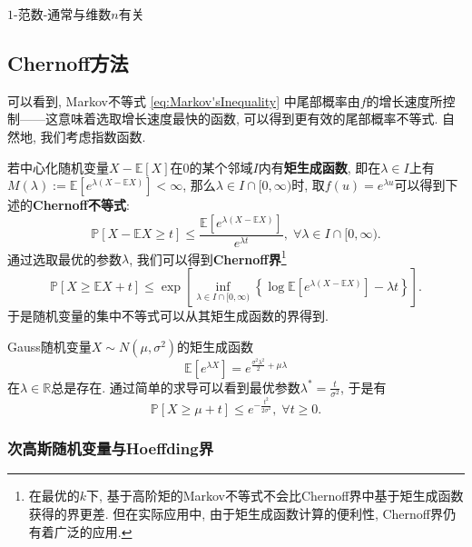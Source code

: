 $1$-范数-通常与维数$n$有关




\subsection{Chernoff方法}

可以看到, Markov不等式 \eqref{eq:Markov'sInequality} 中尾部概率由$f$的增长速度所控制——这意味着选取增长速度最快的函数, 可以得到更有效的尾部概率不等式. 
自然地, 我们考虑指数函数. 

若中心化随机变量$X - \mathbb{E}[X]$在$0$的某个邻域$I$内有\textbf{矩生成函数}, 即在$\lambda \in I$上有$M(\lambda) := \mathbb{E}[e^{\lambda (X - \mathbb{E}X)}] < \infty$, 那么$\lambda \in I \cap [0, \infty)$时, 取$f(u) = e^{\lambda u}$可以得到下述的\textbf{Chernoff不等式}: 
\begin{equation*}
	\mathbb{P}[X - \mathbb{E}X \geq t] 
	\leq \frac{\mathbb{E}[e^{\lambda(X - \mathbb{E}X)}]}{e^{\lambda t}},\;
	\forall \lambda \in I \cap [0, \infty).
\end{equation*}
通过选取最优的参数$\lambda$, 我们可以得到\textbf{Chernoff界}\footnote{在最优的$k$下, 基于高阶矩的Markov不等式不会比Chernoff界中基于矩生成函数获得的界更差. 但在实际应用中, 由于矩生成函数计算的便利性, Chernoff界仍有着广泛的应用.}
\begin{equation*}
	\mathbb{P}[X \geq \mathbb{E}X + t]
	\leq \exp \left[ \inf_{\lambda \in I \cap [0, \infty)} \left\{ \log \mathbb{E}[e^{\lambda(X - \mathbb{E}X)}] - \lambda t \right\} \right]. 
\end{equation*}
于是随机变量的集中不等式可以从其矩生成函数的界得到. 

\begin{example}[Gauss随机变量的上偏差不等式]
	Gauss随机变量$X \sim N(\mu, \sigma^2)$的矩生成函数
	\begin{equation}
		\mathbb{E}[e^{\lambda X}] = e^{\frac{\sigma^2 \lambda^2}{2} + \mu \lambda} 		
	\end{equation}
	在$\lambda \in \mathbb{R}$总是存在. 
	通过简单的求导可以看到最优参数$\lambda^* = \frac{t}{\sigma^2}$, 于是有
	\begin{equation}\label{eq:UpperDeviationOfSubGuassianRV}
		\mathbb{P}[X \geq \mu + t] \leq e^{- \frac{t^2}{2 \sigma^2}},\; \forall t \geq 0. 
	\end{equation}
\end{example}

\subsubsection{次高斯随机变量与Hoeffding界}

